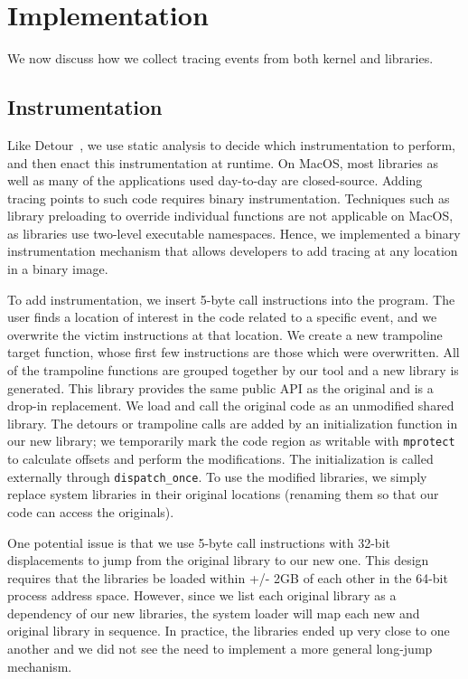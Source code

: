 \section{Implementation}
We now discuss how we collect tracing events from both kernel and libraries.

\subsection{Instrumentation}
Like Detour~\cite{detourXXXXXXXX}, we use static analysis to decide which instrumentation to perform, and then enact this instrumentation at runtime. 
On MacOS, most libraries as well as many of the applications used day-to-day are closed-source.
Adding tracing points to such code requires binary instrumentation.
Techniques such as library preloading to override individual functions are not applicable on MacOS, as libraries use two-level executable namespaces.
Hence, we implemented a binary instrumentation mechanism that allows developers to add tracing at any location in a binary image.

To add instrumentation, we insert 5-byte call instructions into the program. The user finds a location of interest in the code related to a specific event,
and we overwrite the victim instructions at that location. We create a new trampoline target function, whose first few instructions are those which were overwritten.
All of the trampoline functions are grouped together by our tool and a new library is generated.
This library provides the same public API as the original and is a drop-in replacement. We load and call the original code as an unmodified shared library.
The detours or trampoline calls are added by an initialization function in our new library; we temporarily mark the code region as writable with \texttt{mprotect}
to calculate offsets and perform the modifications. The initialization is called externally through \texttt{dispatch\_once}.
To use the modified libraries, we simply replace system libraries in their original locations (renaming them so that our code can access the originals).

One potential issue is that we use 5-byte call instructions with 32-bit displacements to jump from the original library to our new one.
This design requires that the libraries be loaded within +/- 2GB of each other in the 64-bit process address space.
However, since we list each original library as a dependency of our new libraries, the system loader will map each new and original library in sequence.
In practice, the libraries ended up very close to one another and we did not see the need to implement a more general long-jump mechanism.

